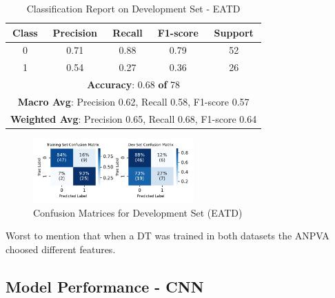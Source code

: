
\begin{table}[H]
\centering
\label{table:classification_report_dev}
\begin{tabular}{|c|c|c|c|c|}
\hline
\textbf{Class} & \textbf{Precision} & \textbf{Recall} & \textbf{F1-score} & \textbf{Support} \\ \hline
0              & 0.71               & 0.88            & 0.79              & 52               \\ \hline
1              & 0.54               & 0.27            & 0.36              & 26               \\ \hline
\multicolumn{5}{|c|}{\textbf{Accuracy}: 0.68 \textbf{of} 78}                        \\ \hline
\multicolumn{5}{|c|}{\textbf{Macro Avg}: Precision 0.62, Recall 0.58, F1-score 0.57} \\ \hline
\multicolumn{5}{|c|}{\textbf{Weighted Avg}: Precision 0.65, Recall 0.68, F1-score 0.64} \\ \hline
\end{tabular}
\caption{Classification Report on Development Set - EATD}
\end{table}

\begin{figure}[H]
\centering
\includegraphics[width=0.55\textwidth]{vis_pdf/eatd_all_confusion_matrices.pdf} %
\caption{Confusion Matrices for Development Set (EATD)}
\label{fig:confusion_matrices}
\end{figure}

Worst to mention that when a DT was trained in both datasets the ANPVA choosed different features. 

\subsection{Model Performance - CNN}